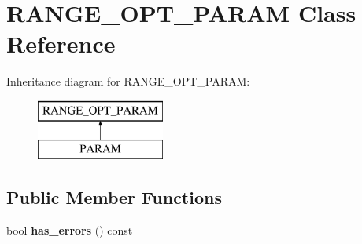 \hypertarget{classRANGE__OPT__PARAM}{}\section{R\+A\+N\+G\+E\+\_\+\+O\+P\+T\+\_\+\+P\+A\+R\+AM Class Reference}
\label{classRANGE__OPT__PARAM}
Inheritance diagram for R\+A\+N\+G\+E\+\_\+\+O\+P\+T\+\_\+\+P\+A\+R\+AM\+:\begin{figure}[H]
\begin{center}
\leavevmode
\includegraphics[height=2.000000cm]{classRANGE__OPT__PARAM}
\end{center}
\end{figure}
\subsection*{Public Member Functions}
\begin{DoxyCompactItemize}
\item 
\mbox{\label{classRANGE__OPT__PARAM_aaf5b521a3b9a2d9a1c6369c0d36a34d3}} 
bool {\bfseries has\+\_\+errors} () const
\end{DoxyCompactItemize}
